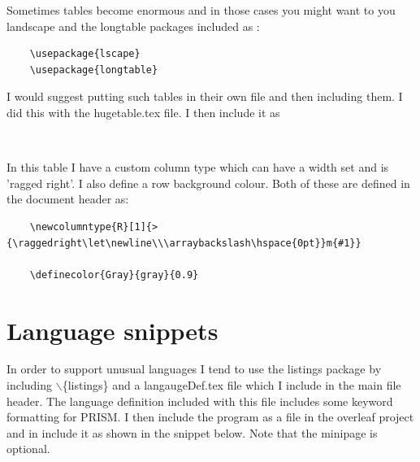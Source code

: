 \documentclass{article}
\begin{document}
Sometimes tables become enormous and in those cases you might want to you landscape and the longtable packages included as :
\begin{verbatim}
    \usepackage{lscape}
    \usepackage{longtable}
\end{verbatim}

I would suggest putting such tables in their own file and then including them. I did this with the \textsf{hugetable.tex} file. I then include it as

\begin{verbatim}
      
\end{verbatim}


In this table I have a custom column type which can have a width set and is 'ragged right'. I also define a row background colour. Both of these are defined in the document header as:
\begin{verbatim}
    \newcolumntype{R}[1]{>{\raggedright\let\newline\\\arraybackslash\hspace{0pt}}m{#1}}

    \definecolor{Gray}{gray}{0.9}
\end{verbatim}

\section{Language snippets}
In order to support unusual languages I tend to use the listings package by including  $\backslash$\{\textsf{listings}\} and a \textsf{langaugeDef.tex} file which I include in the main file header. The language definition included with this file includes some keyword formatting for PRISM. I then include the program as a file in the overleaf project and in include it as shown in the snippet below. Note that the minipage is optional. 

\begin{minipage}{\textwidth}

\end{minipage}

\begin{minipage}{\textwidth}

\end{minipage}
\end{document}
